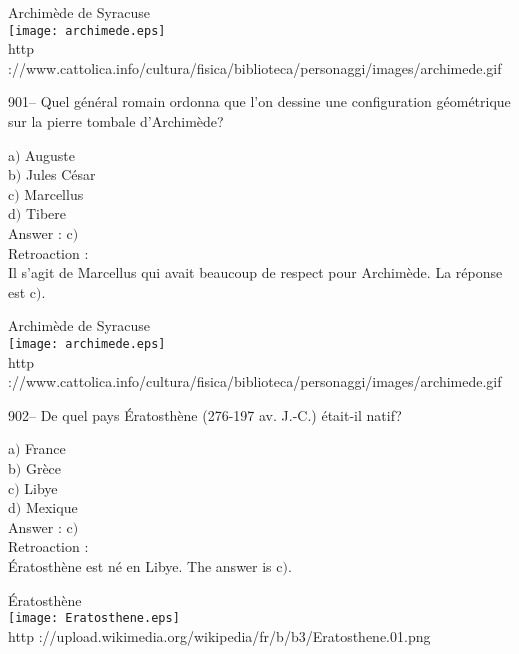 ﻿\documentclass[letterpaper, 12pt]{article}
\begin{document}
        \begin{center}
        Archim\`ede de Syracuse\\
    \texttt{[image: archimede.eps]}\\
        {\footnotesize http
://www.cattolica.info/cultura/fisica/biblioteca/personaggi/images/archimede.gif}
    \end{center}

901-- Quel g\'en\'eral romain ordonna que l'on dessine une
configuration g\'eom\'etrique sur la pierre tombale d'Archim\`ede?

a$)$ Auguste \\
b$)$ Jules C\'esar \\
c$)$ Marcellus \\
d$)$ Tibere \\

Answer : c$)$\\

Retroaction : \\
Il s'agit de Marcellus qui avait beaucoup de respect pour Archim\`ede. La
r\'eponse est c$)$.\\

        \begin{center}
        Archim\`ede de Syracuse\\
    \texttt{[image: archimede.eps]}\\
        {\footnotesize http
://www.cattolica.info/cultura/fisica/biblioteca/personaggi/images/archimede.gif}
    \end{center}

902-- De quel pays \'Eratosth\`ene (276-197 av. J.-C.) \'etait-il
natif?

a$)$ France  \\
b$)$ Gr\`ece  \\
c$)$ Libye \\
d$)$ Mexique \\

Answer : c$)$\\

Retroaction : \\
\'Eratosth\`ene est n\'e en Libye. The answer is c$)$.\\

        \begin{center}
        \'Eratosth\`ene\\
    \texttt{[image: Eratosthene.eps]}\\
        {\footnotesize http
://upload.wikimedia.org/wikipedia/fr/b/b3/Eratosthene.01.png}
    \end{center}
\end{document}
